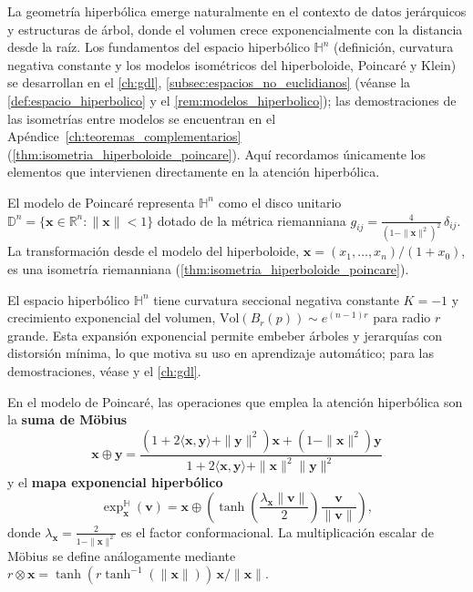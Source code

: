 La geometría hiperbólica emerge naturalmente en el contexto de datos jerárquicos y estructuras de árbol, donde el volumen crece exponencialmente con la distancia desde la raíz. Los fundamentos del espacio hiperbólico $\mathbb{H}^n$ (definición, curvatura negativa constante y los modelos isométricos del hiperboloide, Poincaré y Klein) se desarrollan en el \autoref{ch:gdl}, \autoref{subsec:espacios_no_euclidianos} (véanse la \autoref{def:espacio_hiperbolico} y el \autoref{rem:modelos_hiperbolico}); las demostraciones de las isometrías entre modelos se encuentran en el Apéndice~\ref{ch:teoremas_complementarios} (\autoref{thm:isometria_hiperboloide_poincare}). Aquí recordamos únicamente los elementos que intervienen directamente en la atención hiperbólica.

\begin{definition}\label{def:modelo_poincare}
El modelo de Poincaré representa $\mathbb{H}^n$ como el disco unitario $\mathbb{D}^n = \{\mathbf{x} \in \mathbb{R}^n : \|\mathbf{x}\| < 1\}$ dotado de la métrica riemanniana $g_{ij} = \frac{4}{(1-\|\mathbf{x}\|^2)^2}\, \delta_{ij}$. La transformación desde el modelo del hiperboloide, $\mathbf{x} = (x_1, \ldots, x_n)/(1 + x_0)$, es una isometría riemanniana (\autoref{thm:isometria_hiperboloide_poincare}).
\end{definition}

\begin{theorem}\label{thm:propiedades_espacio_hiperbolico}
El espacio hiperbólico $\mathbb{H}^n$ tiene curvatura seccional negativa constante $K = -1$ y crecimiento exponencial del volumen, $\text{Vol}(B_r(p)) \sim e^{(n-1)r}$ para radio $r$ grande. Esta expansión exponencial permite embeber árboles y jerarquías con distorsión mínima, lo que motiva su uso en aprendizaje automático; para las demostraciones, véase \citep{do1976differential} y el \autoref{ch:gdl}.
\end{theorem}

\begin{definition}\label{def:operaciones_hiperbolicas}
En el modelo de Poincaré, las operaciones que emplea la atención hiperbólica son la \textbf{suma de Möbius}
\begin{equation}
\mathbf{x} \oplus \mathbf{y} = \frac{(1+2\langle\mathbf{x},\mathbf{y}\rangle+\|\mathbf{y}\|^2)\mathbf{x} + (1-\|\mathbf{x}\|^2)\mathbf{y}}{1+2\langle\mathbf{x},\mathbf{y}\rangle+\|\mathbf{x}\|^2\|\mathbf{y}\|^2}
\end{equation}
y el \textbf{mapa exponencial hiperbólico}
\begin{equation}
\exp_{\mathbf{x}}^{\mathbb{H}}(\mathbf{v}) = \mathbf{x} \oplus \left(\tanh\left(\frac{\lambda_{\mathbf{x}} \|\mathbf{v}\|}{2}\right) \frac{\mathbf{v}}{\|\mathbf{v}\|}\right),
\end{equation}
donde $\lambda_{\mathbf{x}} = \frac{2}{1-\|\mathbf{x}\|^2}$ es el factor conformacional. La multiplicación escalar de Möbius se define análogamente mediante $r \otimes \mathbf{x} = \tanh(r \tanh^{-1}(\|\mathbf{x}\|))\, \mathbf{x}/\|\mathbf{x}\|$.
\end{definition}

